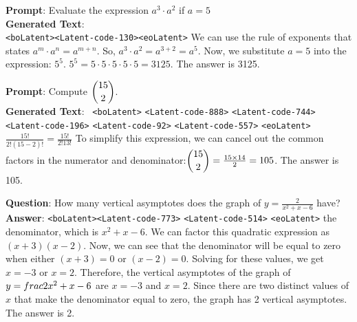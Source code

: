 \begin{minipage}{\columnwidth}
\begin{tcolorbox}[title=Example Generation of Our Latent Approach, colback=white]
\textbf{Prompt}: Evaluate the expression $a^3 \cdot a^2$ if $a= 5$\\
\textbf{Generated Text}: \\
\verb|<boLatent>|\verb|<Latent-code-130>|\verb|<eoLatent>|  We can use the rule of exponents that states $a^m \cdot a^n = a^{m+n}$.
So, $a^3 \cdot a^2 = a^{3+2} = a^5$.
Now, we substitute $a=5$ into the expression: $5^5$.
$5^5 = 5 \cdot 5 \cdot 5 \cdot 5 \cdot 5 = 3125$.
The answer is 3125.
\end{tcolorbox}

\begin{tcolorbox}[title=Example Generation of Our Latent Approach, colback=white]
\textbf{Prompt}: Compute $\dbinom{15}{2}$.\ \\
\textbf{Generated Text}: \
\verb|<boLatent>| \verb|<Latent-code-888>| \verb|<Latent-code-744>| \verb|<Latent-code-196>| \verb|<Latent-code-92>| \verb|<Latent-code-557>| \verb|<eoLatent>|  $\frac{15!}{2!(15-2)!} = \frac{15!} {2!13!}$ To simplify this expression, we can cancel out the common factors in the numerator and denominator:$\dbinom{15}{2} = \frac{15 \times 14}{2} = 105$. The answer is 105.
\end{tcolorbox}

\begin{tcolorbox}[title=Example Generation of Our Latent Approach, colback=white]
\textbf{Question}:  How many vertical asymptotes does the graph of $y=\frac{2}{x^2+x-6}$ have? \\


\textbf{Answer}: 
\verb|<boLatent>|\verb|<Latent-code-773>| \verb|<Latent-code-514>| \verb|<eoLatent>| the denominator, which is $x^2+x-6$.  We can factor this quadratic expression as $(x+3)(x-2)$. Now, we can see that the denominator will be equal to zero when either $(x+3)=0$ or $(x-2)=0$. Solving for these values, we get $x=-3$ or $x=2$.  Therefore, the vertical asymptotes of the graph of $y=\\frac{2}{x^2+x-6}$ are $x=-3$ and $x=2$. Since there are two distinct values of $x$ that make the denominator equal to zero, the graph has 2 vertical asymptotes. The answer is 2.
\end{tcolorbox}
\end{minipage}


